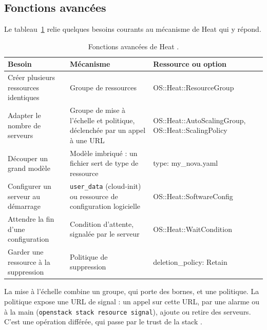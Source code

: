 \subsection{Fonctions avancées}\label{sec:he-avance}

Le tableau~\ref{tab:he-avance} relie quelques besoins courants au mécanisme de Heat qui y répond.

\begin{table}[!ht]
\centering
\renewcommand{\arraystretch}{1.3}
\begin{tabular}{@{}>{\raggedright\arraybackslash}p{4.4cm}>{\raggedright\arraybackslash}p{6.0cm}>{\raggedright\arraybackslash\ttfamily\small}p{5.1cm}@{}}
\toprule
\textbf{Besoin} & \textbf{Mécanisme} & \textrm{\textbf{Ressource ou option}} \\
\midrule
Créer plusieurs ressources identiques & Groupe de ressources & OS::Heat::ResourceGroup \\
Adapter le nombre de serveurs & Groupe de mise à l'échelle et politique, déclenchée par un appel à une URL & OS::Heat::AutoScalingGroup, OS::Heat::ScalingPolicy \\
Découper un grand modèle & Modèle imbriqué : un fichier sert de type de ressource & type: my\_nova.yaml \\
Configurer un serveur au démarrage & \texttt{user\_data} (cloud-init) ou ressource de configuration logicielle & OS::Heat::SoftwareConfig \\
Attendre la fin d'une configuration & Condition d'attente, signalée par le serveur & OS::Heat::WaitCondition \\
Garder une ressource à la suppression & Politique de suppression & deletion\_policy: Retain \\
\bottomrule
\end{tabular}
\caption{Fonctions avancées de Heat \parencite{heat-composition,heat-software-deployment,heat-hot-spec}.}
\label{tab:he-avance}
\end{table}

La mise à l'échelle combine un groupe, qui porte des bornes, et une politique. La politique expose une URL de signal : un appel
sur cette URL, par une alarme ou à la main (\texttt{openstack stack resource signal}), ajoute ou retire des serveurs. C'est une
opération différée, qui passe par le trust de la stack \parencite{heat-resource-types,heat-auth-model}.

